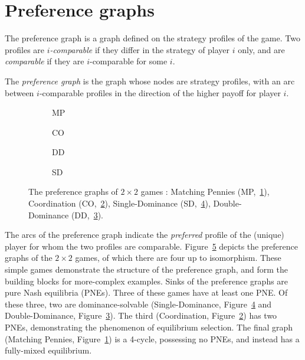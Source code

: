 \documentclass[preprint,authoryear]{elsarticle}
\begin{document}
\section{Preference graphs} \label{sec: graphs}

The preference graph is a graph defined on the strategy profiles of the game. Two profiles are \emph{$i$-comparable} if they differ in the strategy of player $i$ only, and are \emph{comparable} if they are $i$-comparable for some $i$. %

\begin{defn}
    The \emph{preference graph} is the graph whose nodes are strategy profiles, with an arc between $i$-comparable profiles in the direction of the higher payoff for player $i$.
\end{defn}

\begin{figure}
    \centering
    \begin{subfigure}{.2\textwidth}
        \centering
        
        \caption{MP}
        \label{fig:MP}
    \end{subfigure}
    \quad
    \begin{subfigure}{.2\textwidth}
        \centering
        
        \caption{CO}
        \label{fig:CO}
    \end{subfigure}
    \quad
    \begin{subfigure}{.2\textwidth}
        \centering
        
        \caption{DD}
        \label{fig:DD}
    \end{subfigure}
    \quad
    \begin{subfigure}{.2\textwidth}
        \centering
        
        \caption{SD}
        \label{fig:SD}
    \end{subfigure}
    \caption{The preference graphs of $2\times 2$ games \citep{biggar_graph_2023}: Matching Pennies (MP,~\ref{fig:MP}), Coordination (CO,~\ref{fig:CO}), Single-Dominance (SD,~\ref{fig:SD}), Double-Dominance (DD,~\ref{fig:DD}).}
    \label{fig:2x2}
\end{figure}

The arcs of the preference graph indicate the \emph{preferred} profile of the (unique) player for whom the two profiles are comparable. Figure~\ref{fig:2x2} depicts the preference graphs of the $2\times 2$ games, of which there are four up to isomorphism. These simple games demonstrate the structure of the preference graph, and form the building blocks for more-complex examples. Sinks of the preference graphs are pure Nash equilibria (PNEs). Three of these games have at least one PNE. Of these three, two are dominance-solvable (Single-Dominance, Figure~\ref{fig:SD} and Double-Dominance, Figure~\ref{fig:DD}). The third (Coordination, Figure~\ref{fig:CO}) has two PNEs, demonstrating the phenomenon of equilibrium selection. The final graph (Matching Pennies, Figure~\ref{fig:MP}) is a 4-cycle, possessing no PNEs, and instead has a fully-mixed equilibrium. 
\end{document}

